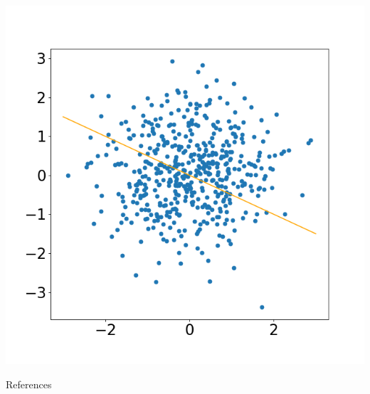 \documentclass[aspectratio=169]{beamer}
\begin{document}
\begin{frame}

\includegraphics[width=0.6 \linewidth]{images/point_cloud.png}

\end{frame}


\appendix

\begin{frame}{References}
	\nocite{*} %
	
	
\end{frame}

\end{document}
